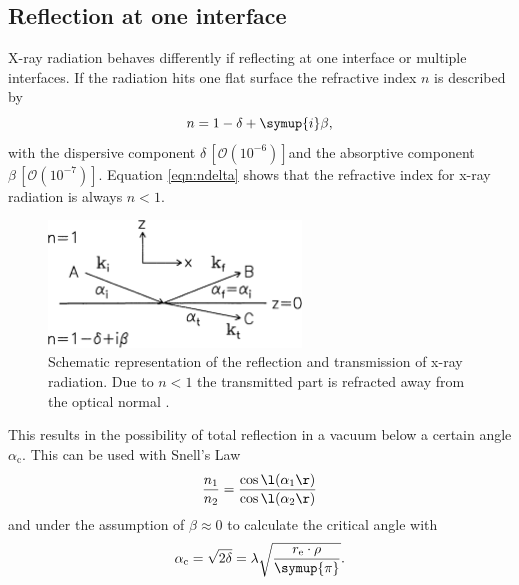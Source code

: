 \subsection{Reflection at one interface}
X-ray radiation behaves differently if reflecting at one interface or multiple interfaces.
If the radiation hits one flat surface the refractive index $n$ is described by
\begin{equation}
    n = 1 - \delta + \symup{i}\beta,
    \label{eqn:ndelta}
\end{equation}
with the dispersive component $\delta\,\left[\mathcal{O}\left(10^{-6}\right)\right]$and the absorptive component $\beta\,\left[\mathcal{O}\left(10^{-7}\right)\right]$.
Equation \eqref{eqn:ndelta} shows that the refractive index for x-ray radiation is always $n < 1$.
\begin{figure}
    \centering
    \includegraphics[width=0.6\textwidth]{images/scattering.png}
    \caption{Schematic representation of the reflection and transmission of x-ray radiation.
    Due to $n<1$ the transmitted part is refracted away from the optical normal \cite[7]{V44:xrr_tolan}.}
    \label{fig:reflection}
\end{figure}
This results in the possibility of total reflection in a vacuum below a certain angle $\alpha_\text{c}$.
This can be used with Snell's Law
\begin{equation*}
    \frac{n_1}{n_2} = \frac{\cos\l(\alpha_1\r)}{\cos\l(\alpha_2\r)}
\end{equation*}
and under the assumption of $\beta\approx0$ to calculate the critical angle with 
\begin{equation}
    \alpha_\text{c} = \sqrt{2\delta} = \lambda\sqrt{\frac{r_\text{e}\cdot\rho}{\symup{\pi}}}.
    \label{eqn:critical_angle}
\end{equation}

